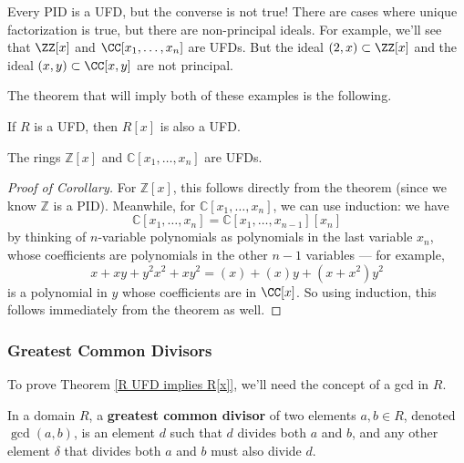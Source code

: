 Every PID is a UFD, but the converse is not true! There are cases where unique factorization is true, but there are non-principal ideals. For example, we'll see that $\ZZ[x]$ and $\CC[x_1, \ldots, x_n]$ are UFDs. But the ideal $(2, x) \subset \ZZ[x]$ and the ideal $(x, y) \subset \CC[x, y]$ are not principal. 

The theorem that will imply both of these examples is the following. 

\begin{theorem} \label{R UFD implies R[x]}
If $R$ is a UFD, then $R[x]$ is also a UFD.
\end{theorem}

\begin{corollary}
    The rings $\mathbb{Z}[x]$ and $\mathbb{C}[x_1, \ldots, x_n]$ are UFDs. 
\end{corollary}

\begin{proof}[Proof of Corollary]
    For $\mathbb{Z}[x]$, this follows directly from the theorem (since we know $\mathbb{Z}$ is a PID). Meanwhile, for $\mathbb{C}[x_1, \ldots, x_n]$, we can use induction: we have \[\mathbb{C}[x_1, \ldots, x_n] = \mathbb{C}[x_1, \ldots, x_{n - 1}][x_n]\] by thinking of $n$-variable polynomials as polynomials in the last variable $x_n$, whose coefficients are polynomials in the other $n - 1$ variables --- for example, \[x + xy + y^2x^2 + xy^2 = (x) + (x)y + (x + x^2)y^2\] is a polynomial in $y$ whose coefficients are in $\CC[x]$. So using induction, this follows immediately from the theorem as well. 
\end{proof}

\subsubsection{Greatest Common Divisors}

To prove Theorem \ref{R UFD implies R[x]}, we'll need the concept of a gcd in $R$. 

\begin{definition}
In a domain $R$, a \textbf{greatest common divisor} of two elements $a, b \in R$, denoted $\gcd(a, b)$, is an element $d$ such that $d$ divides both $a$ and $b$, and any other element $\delta$ that divides both $a$ and $b$ must also divide $d$.
\end{definition}

